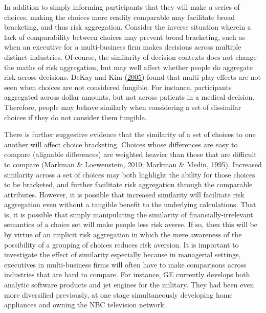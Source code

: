\documentclass[
  english,
  man, donotrepeattitle,floatsintext]{apa7}
\theoremstyle{definition}
\theoremstyle{definition}
\theoremstyle{definition}
\theoremstyle{definition}
\theoremstyle{remark}
\begin{document}
In addition to simply informing participants that they will make a series of
choices, making the choices more readily comparable may facilitate broad
bracketing, and thus risk aggregation. Consider the inverse situation wherein a
lack of comparability between choices may prevent broad bracketing, such as when
an executive for a multi-business firm makes decisions across multiple distinct
industries. Of course, the similarity of decision contexts does not change the
maths of risk aggregation, but may well affect whether people do aggregate risk
across decisions. DeKay and Kim (\protect\hyperlink{ref-dekay2005}{2005}) found that multi-play effects are not seen when
choices are not considered fungible. For instance, participants aggregated
across dollar amounts, but not across patients in a medical decision. Therefore,
people may behave similarly when considering a set of dissimilar choices if they
do not consider them fungible.

There is further suggestive evidence that the similarity of a set of choices to
one another will affect choice bracketing. Choices whose differences are easy to
compare (alignable differences) are weighted heavier than those that are
difficult to compare (Markman \& Loewenstein, \protect\hyperlink{ref-markman2010}{2010}; Markman \& Medin, \protect\hyperlink{ref-markman1995}{1995}). Increased similarity across a
set of choices may both highlight the ability for those choices to be bracketed,
and further facilitate risk aggregation through the comparable attributes.
However, it is possible that increased similarity will facilitate risk
aggregation even without a tangible benefit to the underlying calculations. That
is, it is possible that simply manipulating the similarity of
financially-irrelevant semantics of a choice set will make people less risk
averse. If so, then this will be by virtue of an implicit risk aggregation in
which the mere awareness of the possibility of a grouping of choices reduces
risk aversion. It is important to investigate the effect of similarity
especially because in managerial settings, executives in multi-business firms
will often have to make comparisons across industries that are hard to compare.
For instance, GE currently develops both analytic software products and jet
engines for the military. They had been even more diversified previously, at one
stage simultaneously developing home appliances and owning the NBC television
network.
\end{document}
